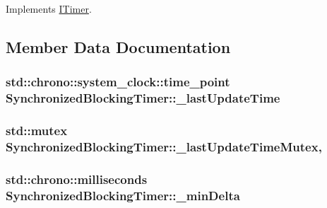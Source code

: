 Implements \hyperlink{class_i_timer_afa6c0d962817423715ce9f944f1b6a2c}{I\-Timer}.



\subsection{Member Data Documentation}
\hypertarget{class_synchronized_blocking_timer_af62f107591c594d9dd0d02ae1704e837}{
\subsubsection[{\-\_\-last\-Update\-Time}]{\setlength{\rightskip}{0pt plus 5cm}std\-::chrono\-::system\-\_\-clock\-::time\-\_\-point Synchronized\-Blocking\-Timer\-::\-\_\-last\-Update\-Time\hspace{0.3cm}{\ttfamily [protected]}}}\label{class_synchronized_blocking_timer_af62f107591c594d9dd0d02ae1704e837}
\hypertarget{class_synchronized_blocking_timer_a58be1f30a605ac30c54590965bbe5ddb}{
\subsubsection[{\-\_\-last\-Update\-Time\-Mutex}]{\setlength{\rightskip}{0pt plus 5cm}std\-::mutex Synchronized\-Blocking\-Timer\-::\-\_\-last\-Update\-Time\-Mutex\hspace{0.3cm}{\ttfamily [mutable]}, {\ttfamily [protected]}}}\label{class_synchronized_blocking_timer_a58be1f30a605ac30c54590965bbe5ddb}
\hypertarget{class_synchronized_blocking_timer_a61a45cf02dfe6a18392f493459d98790}{
\subsubsection[{\-\_\-min\-Delta}]{\setlength{\rightskip}{0pt plus 5cm}std\-::chrono\-::milliseconds Synchronized\-Blocking\-Timer\-::\-\_\-min\-Delta\hspace{0.3cm}{\ttfamily [protected]}}}\label{class_synchronized_blocking_timer_a61a45cf02dfe6a18392f493459d98790}


